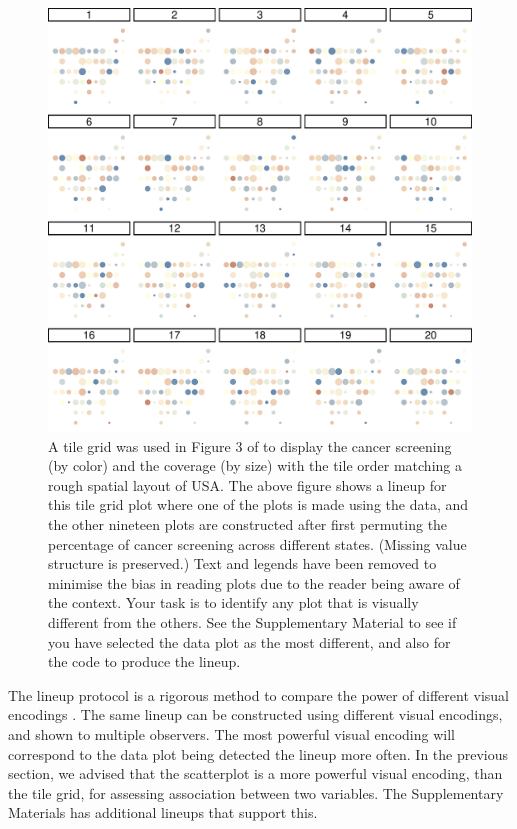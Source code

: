 \documentclass[ijds,nonblindrev]{informs-ijds}
\begin{document}
\begin{figure}[h!]
    \centering
    \includegraphics[width = \textwidth]{lineup-theirs-1.pdf}
    \caption{A tile grid was used in Figure 3 of \citet{basole2021} to display the cancer screening (by color) and the coverage (by size) with the tile order matching a rough spatial layout of USA. The above figure shows a lineup for this tile grid plot where one of the plots is made using the data, and the other nineteen plots are constructed after first permuting the percentage of cancer screening across different states. (Missing value structure is preserved.) Text and legends have been removed to minimise the bias in reading plots due to the reader being aware of the context. Your task is to identify any plot that is visually different from the others. See the Supplementary Material to see if you have selected the data plot as the most different, and also for the code to produce the lineup.}
    \label{fig:fig3-lineup}
\end{figure}

The lineup protocol is a rigorous method to compare the power of different visual encodings \citep[see examples in][]{hofmann2012graphical}. The same lineup can be constructed using different visual encodings, and shown to multiple observers. The most powerful visual encoding will correspond to the data plot being detected the lineup more often. In the previous section, we advised that the scatterplot is a more powerful visual encoding, than the tile grid, for assessing association between two variables.  The Supplementary Materials has additional lineups that support this. 
\end{document}
